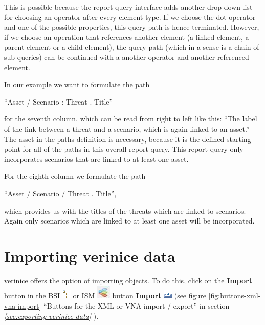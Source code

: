 \documentclass[a4paper,10pt]{book}
\begin{document}
This is possible because the report query interface adds another drop-down list
for choosing an operator after every element type. If we choose the dot operator
and one of the possible properties, this query path is hence terminated.
However, if we choose an operation that references another element (a linked
element, a parent element or a child element), the query path (which in a sense
is a chain of sub-queries) can be continued with a another operator and another
referenced element.

In our example we want to formulate the path

``Asset / Scenario : Threat . Title''

for the seventh column, which can be read from right to left like this:
``The label of the link between a threat and a scenario, which is again linked
to an asset.'' The asset in the paths definition is necessary, because it is the
defined starting point for all of the paths in this overall report query. This
report query only incorporates scenarios that are linked to at least one asset.

For the eighth column we formulate the path

``Asset / Scenario / Threat . Title'',

which provides us with the titles of the threats which are linked to
scenarios. Again only scenarios which are linked to at least one asset will be
incorporated.


\section{Importing verinice data}
verinice offers the option of importing objects. To do this, click on the \textbf{Import} button in the
BSI \includegraphics[height=2ex]{Icon/GS_Modell.png} or ISM \includegraphics[height=2ex]{Icon/Informationssicherheitsmodell.png}
button \textbf{Import} \includegraphics[height=2ex]{Icon/Import.png} (see figure \ref{fig:buttons-xml-vna-import} ``Buttons for the XML or VNA import / export''
in section {\em \ref{sec:exporting-verinice-data} }).
\end{document}
